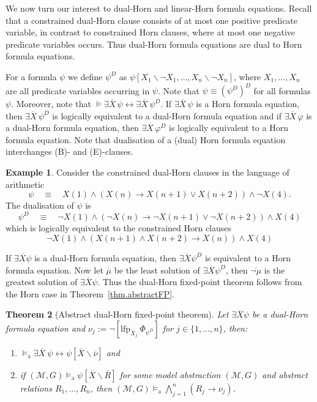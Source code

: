 \documentclass[acmsmall]{acmart}
\theoremstyle{plain}
\newtheorem{theorem}{Theorem}
\theoremstyle{definition}
\newtheorem{example}[theorem]{Example}
\newcommand{\calM}{\mathcal{M}}
\newcommand{\mybar}[1]{\overline{#1}}
\newcommand{\sop}{[} %
\newcommand{\scl}{]} %
\newcommand{\sel}[2]{#1 \backslash #2} %
\newcommand{\impl}{\rightarrow} %
\newcommand{\liff}{\leftrightarrow} %
\newcommand{\lfp}{\mathrm{lfp}} %
\newcommand{\modelsa}{\models_\mathrm{a}} %
\begin{document}
We now turn our interest to dual-Horn and linear-Horn formula equations. Recall that a constrained dual-Horn clause consists of at most one positive predicate variable, in contrast to constrained Horn clauses, where at most one negative predicate variables occurs. Thus dual-Horn formula equations are dual to Horn formula equations.

For a formula $\psi$ we define $\psi^D$ as $\psi\sop \sel{X_1}{\neg X_1}, \ldots, \sel{X_n}{\neg X_n} \scl$,
 where $X_1,\ldots,X_n$ are all predicate variables occurring in $\psi$.
Note that $\psi \equiv (\psi^D)^D$ for all formulas $\psi$.
Moreover, note that $\models \exists \mybar{X}\, \psi \liff \exists \mybar{X}\, \psi^D$.
If $\exists \mybar{X}\, \psi$ is a Horn formula equation, then $\exists \mybar{X}\, \psi^D$ is logically
 equivalent to a dual-Horn formula equation and if $\exists \mybar{X}\, \varphi$ is a dual-Horn formula
 equation, then $\exists \mybar{X}\, \varphi^D$ is logically equivalent to a Horn formula equation.
Note that dualisation of a (dual) Horn formula equation interchanges (B)- and (E)-clauses.
%
\begin{example}
Consider the constrained dual-Horn clauses in the language of arithmetic
\[
\psi \quad\equiv\quad X(1) \land ( X(n) \impl X(n+1) \lor X(n+2)) \land \neg X(4).
\]
The dualisation of $\psi$ is
\[
\psi^D \quad\equiv\quad \neg X(1) \land ( \neg X(n) \impl \neg X(n+1) \lor \neg X(n+2)) \land X(4)
\]
which is logically equivalent to the constrained Horn clauses
\[
\neg X(1) \land ( X(n+1) \land X(n+2) \impl  X(n)) \land X(4)
\]
\end{example}
%

If $\exists \mybar{X} \psi$ is a dual-Horn formula equation, then $\exists \mybar{X} \psi^D$ is equivalent to a Horn formula equation. Now let $\mybar{\mu}$ be the least solution of $\exists \mybar{X} \psi^D$, then $\mybar{\neg \mu}$ is the greatest solution of $\exists \mybar{X} \psi$. Thus the dual-Horn fixed-point theorem follows from the Horn case in
 Theorem~\ref{thm.abstractFP}.

\begin{theorem}[Abstract dual-Horn fixed-point theorem]\label{thm.abstractDualFP}
	Let $\exists \mybar{X} \psi$ be a dual-Horn formula equation and $\nu_j := \neg [\lfp_{X_j} ~\Phi_{\psi^D}]$ for $j \in \{1,...,n\}$, then:
	\begin{enumerate}
		\item $\modelsa \exists \mybar{X}  ~\psi \leftrightarrow \psi[\mybar{X}\backslash \mybar{\nu}]$ and
		\item if $(\calM,G) \modelsa \psi[\mybar{X}\backslash \mybar{R}]$ for some model abstraction $(\calM,G)$ and abstract relations $R_1,...,R_n$, then $(\calM,G) \modelsa \bigwedge_{j=1}^n (R_j \rightarrow \nu_j)$.
	\end{enumerate}
\end{theorem}
\end{document}
